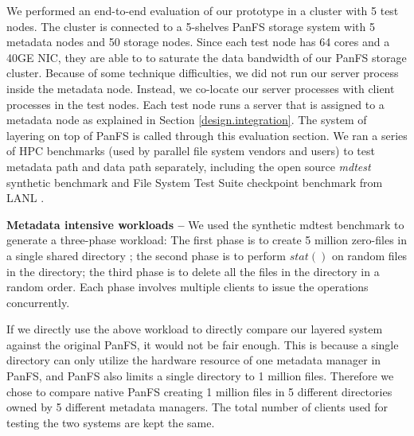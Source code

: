 We performed an end-to-end evaluation of our prototype in a cluster with 5 test nodes.
The cluster is connected to a 5-shelves PanFS storage system
with 5 metadata nodes and 50 storage nodes.
Since each test node has 64 cores and a 40GE NIC, they are able to
to saturate the data bandwidth of our PanFS storage cluster.
Because of some technique difficulties,
we did not run our \sys server process inside the metadata node.
Instead, we co-locate our \sys server processes
with client processes in the test nodes.
Each test node runs a \sys server that is assigned to a metadata node
as explained in Section \ref{design.integration}.
The system of layering \sys on top of PanFS is called \psys through
this evaluation section.
We ran a series of HPC benchmarks (used by parallel file system vendors and users)
to test metadata path and data path separately,
including the open source \textit{mdtest} synthetic benchmark \cite{mdtest}
and File System Test Suite checkpoint benchmark from LANL \cite{mpiio}.

\textbf{Metadata intensive workloads -- }
We used the synthetic mdtest benchmark \cite{mdtest}
to generate a three-phase workload:
The first phase is to create 5 million
zero-files in a single shared directory \cite{ceph:weil06, GIGA11};
the second phase is to perform $stat()$ on random files in the directory;
the third phase is to delete all the files in the directory in a random order.
Each phase involves multiple clients to issue the operations concurrently.

If we directly use the above workload to directly compare our layered system
against the original PanFS, it would not be fair enough.
This is because a single directory can only utilize the hardware resource
of one metadata manager in PanFS,
and PanFS also limits a single directory to 1 million files.
Therefore we chose to compare native PanFS creating 1 million files
in 5 different directories owned by 5 different metadata managers.
The total number of clients used for testing the two systems
are kept the same.

